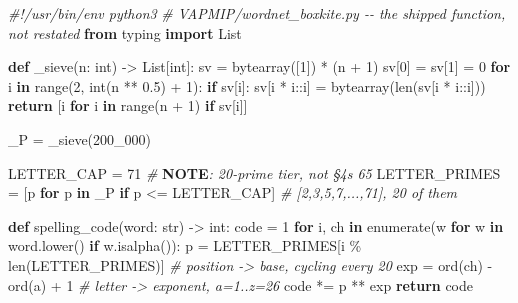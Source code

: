 \documentclass[
  10pt,
]{article}
\newenvironment{Shaded}{}{}
\newcommand{\AlertTok}[1]{\textcolor[rgb]{1.00,0.00,0.00}{\textbf{#1}}}
\newcommand{\BuiltInTok}[1]{\textcolor[rgb]{0.00,0.50,0.00}{#1}}
\newcommand{\CommentTok}[1]{\textcolor[rgb]{0.38,0.63,0.69}{\textit{#1}}}
\newcommand{\ControlFlowTok}[1]{\textcolor[rgb]{0.00,0.44,0.13}{\textbf{#1}}}
\newcommand{\DecValTok}[1]{\textcolor[rgb]{0.25,0.63,0.44}{#1}}
\newcommand{\FloatTok}[1]{\textcolor[rgb]{0.25,0.63,0.44}{#1}}
\newcommand{\ImportTok}[1]{\textcolor[rgb]{0.00,0.50,0.00}{\textbf{#1}}}
\newcommand{\KeywordTok}[1]{\textcolor[rgb]{0.00,0.44,0.13}{\textbf{#1}}}
\newcommand{\NormalTok}[1]{#1}
\newcommand{\OperatorTok}[1]{\textcolor[rgb]{0.40,0.40,0.40}{#1}}
\newcommand{\StringTok}[1]{\textcolor[rgb]{0.25,0.44,0.63}{#1}}
\begin{document}
\begin{Shaded}
\begin{Highlighting}[]
\CommentTok{\#!/usr/bin/env python3}
\CommentTok{\# VAPMIP/wordnet\_boxkite.py {-}{-} the shipped function, not restated}
\ImportTok{from}\NormalTok{ typing }\ImportTok{import}\NormalTok{ List}

\KeywordTok{def}\NormalTok{ \_sieve(n: }\BuiltInTok{int}\NormalTok{) }\OperatorTok{{-}\textgreater{}}\NormalTok{ List[}\BuiltInTok{int}\NormalTok{]:}
\NormalTok{    sv }\OperatorTok{=} \BuiltInTok{bytearray}\NormalTok{([}\DecValTok{1}\NormalTok{]) }\OperatorTok{*}\NormalTok{ (n }\OperatorTok{+} \DecValTok{1}\NormalTok{)}
\NormalTok{    sv[}\DecValTok{0}\NormalTok{] }\OperatorTok{=}\NormalTok{ sv[}\DecValTok{1}\NormalTok{] }\OperatorTok{=} \DecValTok{0}
    \ControlFlowTok{for}\NormalTok{ i }\KeywordTok{in} \BuiltInTok{range}\NormalTok{(}\DecValTok{2}\NormalTok{, }\BuiltInTok{int}\NormalTok{(n }\OperatorTok{**} \FloatTok{0.5}\NormalTok{) }\OperatorTok{+} \DecValTok{1}\NormalTok{):}
        \ControlFlowTok{if}\NormalTok{ sv[i]:}
\NormalTok{            sv[i }\OperatorTok{*}\NormalTok{ i::i] }\OperatorTok{=} \BuiltInTok{bytearray}\NormalTok{(}\BuiltInTok{len}\NormalTok{(sv[i }\OperatorTok{*}\NormalTok{ i::i]))}
    \ControlFlowTok{return}\NormalTok{ [i }\ControlFlowTok{for}\NormalTok{ i }\KeywordTok{in} \BuiltInTok{range}\NormalTok{(n }\OperatorTok{+} \DecValTok{1}\NormalTok{) }\ControlFlowTok{if}\NormalTok{ sv[i]]}

\NormalTok{\_P }\OperatorTok{=}\NormalTok{ \_sieve(}\DecValTok{200\_000}\NormalTok{)}

\NormalTok{LETTER\_CAP }\OperatorTok{=} \DecValTok{71}                                      \CommentTok{\# }\AlertTok{NOTE}\CommentTok{: 20{-}prime tier, not §4\textquotesingle{}s 65}
\NormalTok{LETTER\_PRIMES }\OperatorTok{=}\NormalTok{ [p }\ControlFlowTok{for}\NormalTok{ p }\KeywordTok{in}\NormalTok{ \_P }\ControlFlowTok{if}\NormalTok{ p }\OperatorTok{\textless{}=}\NormalTok{ LETTER\_CAP]   }\CommentTok{\# [2,3,5,7,...,71], 20 of them}

\KeywordTok{def}\NormalTok{ spelling\_code(word: }\BuiltInTok{str}\NormalTok{) }\OperatorTok{{-}\textgreater{}} \BuiltInTok{int}\NormalTok{:}
\NormalTok{    code }\OperatorTok{=} \DecValTok{1}
    \ControlFlowTok{for}\NormalTok{ i, ch }\KeywordTok{in} \BuiltInTok{enumerate}\NormalTok{(w }\ControlFlowTok{for}\NormalTok{ w }\KeywordTok{in}\NormalTok{ word.lower() }\ControlFlowTok{if}\NormalTok{ w.isalpha()):}
\NormalTok{        p }\OperatorTok{=}\NormalTok{ LETTER\_PRIMES[i }\OperatorTok{\%} \BuiltInTok{len}\NormalTok{(LETTER\_PRIMES)]    }\CommentTok{\# position {-}\textgreater{} base, cycling every 20}
\NormalTok{        exp }\OperatorTok{=} \BuiltInTok{ord}\NormalTok{(ch) }\OperatorTok{{-}} \BuiltInTok{ord}\NormalTok{(}\StringTok{\textquotesingle{}a\textquotesingle{}}\NormalTok{) }\OperatorTok{+} \DecValTok{1}                 \CommentTok{\# letter {-}\textgreater{} exponent, a=1..z=26}
\NormalTok{        code }\OperatorTok{*=}\NormalTok{ p }\OperatorTok{**}\NormalTok{ exp}
    \ControlFlowTok{return}\NormalTok{ code}
\end{Highlighting}
\end{Shaded}
\end{document}
